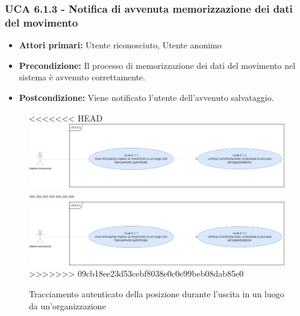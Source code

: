 \subsubsection{UCA 6.1.3 - Notifica di avvenuta memorizzazione dei dati del movimento}
\begin{itemize}
	\item \textbf{Attori primari:} Utente riconosciuto, Utente anonimo
	\item \textbf{Precondizione:} Il processo di memorizzazione dei dati del movimento nel sistema è avvenuto correttamente.
	\item \textbf{Postcondizione:} Viene notificato l'utente dell'avvenuto salvataggio.
\end{itemize}

\begin{figure}[h]
	\centering
<<<<<<< HEAD
	\includegraphics[scale=0.3]{sezioni/UseCase/Immagini/UCA6.2.png}
=======
	\includegraphics[scale=0.4]{sezioni/UseCase/Immagini/UCA6.2.png}
>>>>>>> 09cb18ee23d53cebf8038e0c0e99beb08dab85e0
	\caption{Tracciamento autenticato della posizione durante l'uscita in un luogo da un'organizzazione}
\end{figure} 

